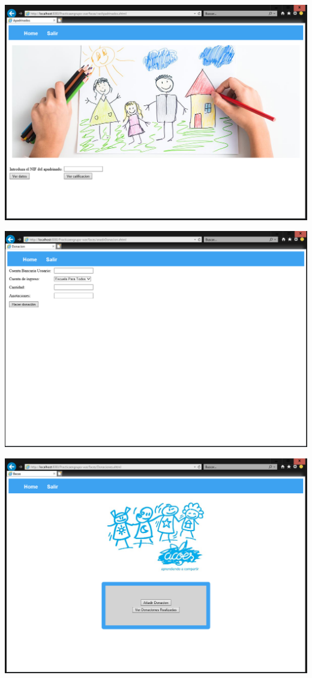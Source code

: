 \documentclass{article}
\begin{document}
\begin{center}
\includegraphics[scale=0.5]{capturas/VERAPADRINADOS.PNG}
\end{center}

\begin{center}
\includegraphics[scale=0.5]{capturas/ANADIRDONACION.PNG}
\end{center}

\begin{center}
\includegraphics[scale=0.5]{capturas/DONACIONES.PNG}
\end{center}
\end{document}
